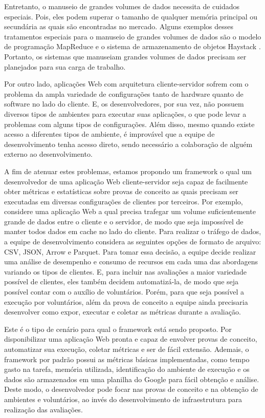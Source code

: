 \documentclass[12pt]{tcc}
\begin{document}
Entretanto, o manuseio de grandes volumes de dados necessita de cuidados especiais.
Pois, eles podem superar o tamanho de qualquer memória principal ou secundária as quais são encontradas no mercado.
Alguns exemplos desses tratamentos especiais para o manuseio de grandes volumes de dados são o modelo de programação MapReduce \citep{Dean2008MapReduce} e o sistema de armazenamento de objetos Haystack \citep{Beaver2010Finding}.
Portanto, os sistemas que manuseiam grandes volumes de dados precisam ser planejados para sua carga de trabalho.

Por outro lado, aplicações Web com arquitetura cliente-servidor sofrem com o problema da ampla variedade de configurações tanto de hardware quanto de software no lado do cliente.
E, os desenvolvedores, por sua vez, não possuem diversos tipos de ambientes para executar suas aplicações, o que pode levar a problemas com alguns tipos de configurações.
Além disso, mesmo quando existe acesso a diferentes tipos de ambiente, é improvável que a equipe de desenvolvimento tenha acesso direto, sendo necessário a colaboração de alguém externo ao desenvolvimento.

A fim de atenuar estes problemas, estamos propondo um framework o qual um desenvolvedor de uma aplicação Web cliente-servidor seja capaz de facilmente obter métricas e estatísticas sobre provas de conceito as quais precisam ser executadas em diversas configurações de clientes por terceiros.
Por exemplo, considere uma aplicação Web a qual precisa trafegar um volume suficientemente grande de dados entre o cliente e o servidor, de modo que seja impossível de manter todos dados em cache no lado do cliente.
Para realizar o tráfego de dados, a equipe de desenvolvimento considera as seguintes opções de formato de arquivo: CSV, JSON, Arrow e Parquet.
Para tomar essa decisão, a equipe decide realizar uma análise de desempenho e consumo de recursos em cada uma das abordagens variando os tipos de clientes.
E, para incluir nas avaliações a maior variedade possível de clientes, eles também decidem automatizá-la, de modo que seja possível contar com o auxílio de voluntários.
Porém, para que seja possível a execução por voluntários, além da prova de conceito a equipe ainda precisaria desenvolver como expor, executar e coletar as métricas durante a avaliação.

Este é o tipo de cenário para qual o framework está sendo proposto.
Por disponibilizar uma aplicação Web pronta e capaz de envolver provas de conceito, automatizar sua execução, coletar métricas e ser de fácil extensão.
Ademais, o framework por padrão possui as métricas básicas implementadas, como tempo gasto na tarefa, memória utilizada, identificação do ambiente de execução e os dados são armazenados em uma planilha do Google para fácil obtenção e análise.
Deste modo, o desenvolvedor pode focar nas provas de conceito e na obtenção de ambientes e voluntários, ao invés do desenvolvimento de infraestrutura para realização das avaliações.
\end{document}
